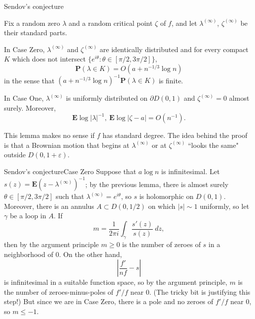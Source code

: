 \documentclass[10pt]{beamer}
\begin{document}
\begin{frame}{Sendov's conjecture}
\begin{lemma}
    Fix a random zero $\lambda$ and a random critical point $\zeta$ of $f$, and let $\lambda^{(\infty)}$, $\zeta^{(\infty)}$ be their standard parts.

\pause

    In Case Zero, $\lambda^{(\infty)}$ and $\zeta^{(\infty)}$ are identically distributed and for every compact $K$ which does not intersect $\{e^{i\theta}: \theta \in [\pi/2, 3\pi/2]\}$,
    $$\mathbf P(\lambda \in K) = O(a + n^{-1/3} \log n)$$
    in the sense that $(a + n^{-1/3} \log n)^{-1} \mathbf P(\lambda \in K)$ is finite.

\pause

    In Case One, $\lambda^{(\infty)}$ is uniformly distributed on $\partial D(0, 1)$ and $\zeta^{(\infty)} = 0$ almost surely. Moreover,
    $$\mathbf E \log |\lambda|^{-1}, ~\mathbf E \log |\zeta - a| = O(n^{-1}).$$
\end{lemma}

\pause

This lemma makes no sense if $f$ has standard degree. The idea behind the proof is that a Brownian motion that begins at $\lambda^{(\infty)}$ or at $\zeta^{(\infty)}$ ``looks the same" outside $D(0, 1 + \varepsilon)$.
\end{frame}

\begin{frame}{Sendov's conjecture}{Case Zero}
    Suppose that $a \log n$ is infinitesimal. \pause Let $s(z) = \mathbf E(z - \lambda^{(\infty)})^{-1}$; by the previous lemma, there is almost surely $\theta \in [\pi/2,3\pi/2]$ such that $\lambda^{(\infty)} = e^{i\theta}$, so $s$ is holomorphic on $D(0, 1)$. \pause
    Moreover, there is an annulus $A \subset D(0, 1/2)$ on which $|s| \sim 1$ uniformly, so let $\gamma$ be a loop in $A$. \pause
    If
    $$m = \frac{1}{2\pi i}\int_\gamma \frac{s'(z)}{s(z)} ~dz,$$
    then by the argument principle $m \geq 0$ is the number of zeroes of $s$ in a neighborhood of $0$. \pause
    On the other hand,
    $$\left|\frac{f'}{nf} - s\right|$$
    is infinitesimal in a suitable function space, \pause so by the argument principle, $m$ is the number of zeroes-minus-poles of $f'/f$ near $0$. \pause
    (The tricky bit is justifying this step!) \pause
    But since we are in Case Zero, there is a pole and no zeroes of $f'/f$ near $0$, so $m \leq -1$.
\end{frame}
\end{document}
